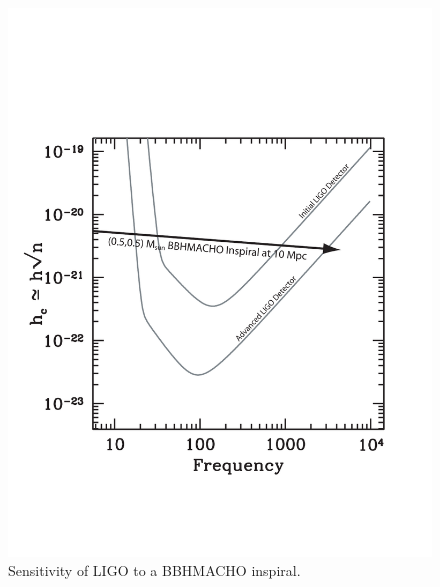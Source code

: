 \begin{figure}[p]
\begin{center}
\includegraphics[width=\linewidth]{figures/macho/noisecurves}
\end{center}
\caption{\label{f:machosensitivity}%
Sensitivity of LIGO to a BBHMACHO inspiral.
}
\end{figure}

